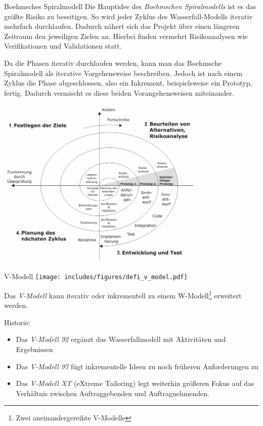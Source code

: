 \begin{bonus}{Boehmsches Spiralmodell}
    Die Hauptidee des \emph{Boehmschen Spiralmodells} ist es das größte Risiko zu beseitigen.
    So wird jeder Zyklus des Wasserfall-Modells iterativ mehrfach durchlaufen.
    Dadurch nähert sich das Projekt über einen längeren Zeitraum den jeweiligen Zielen an.
    Hierbei finden vermehrt Risikoanalysen wie Verifikationen und Validationen statt.

    Da die Phasen iterativ durchlaufen werden, kann man das Boehmsche Spiralmodell als iterative Vorgehensweise beschreiben.
    Jedoch ist nach einem Zyklus die Phase abgeschlossen, also ein Inkrement, beispielsweise ein Prototyp, fertig.
    Dadurch vermischt es diese beiden Vorangehensweisen miteinander.

    \begin{center}
        \includegraphics[width=0.75\textwidth]{includes/figures/bonus_boehmsches_spiralmodell.png}
    \end{center}
\end{bonus}

\begin{defi}{V-Modell}
    \texttt{[image: includes/figures/defi\_v\_model.pdf]}

    Das \emph{V-Modell} kann iterativ oder inkrementell zu einem W-Modell\footnote{Zwei aneinandergereihte V-Modelle} erweitert werden.

    Historie:
    \begin{itemize}
        \item Das \emph{V-Modell 92} ergänzt das Wasserfallmodell mit Aktivitäten und Ergebnissen
        \item Das \emph{V-Modell 97} fügt inkrementelle Ideen zu noch früheren Anforderungen zu
        \item Das \emph{V-Modell XT} (eXtreme Tailoring) legt weiterhin größeren Fokus auf das Verhältnis zwischen Auftraggebenden und Auftragnehmenden.
    \end{itemize}
\end{defi}

